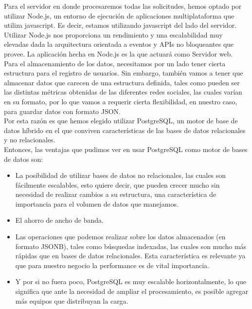 \documentclass[oneside]{book}
\begin{document}
	
Para el servidor en donde procesaremos todas las solicitudes, hemos optado por utilizar Node.js, un entorno de ejecuci\'{o}n de aplicaciones multiplataforma que utiliza javascript. Es decir, estamos utilizando javascript del lado del servidor. Utilizar Node.js nos proporciona un rendimiento y una escalabilidad muy elevadas dada la arquitectura orientada a eventos y APIs no bloqueantes que provee. La aplicación hecha en Node.js es la que actuar\'{a} como Servidor web.\\

Para el almacenamiento de los datos, necesitamos por un lado tener cierta estructura para el registro de usuarios. Sin embargo, tambi\'{e}n vamos a tener que almacenar datos que carecen de una estructura definida, tales como pueden ser las distintas m\'{e}tricas obtenidas de las diferentes redes sociales, las cuales var\'{i}an en su formato, por lo que vamos a requerir cierta flexibilidad, en nuestro caso, para guardar datos con formato JSON.\\
Por esta raz\'{o}n es que hemos elegido utilizar PostgreSQL, un motor de base de datos h\'{i}brido en el que conviven caracter\'{i}sticas de las bases de datos relacionales y no relacionales.\\

Entonces, las ventajas que pudimos ver en usar PostgreSQL como motor de bases de datos son:

\begin{itemize}

\item La posibilidad de utilizar bases de datos no relacionales, las cuales son f\'{a}cilmente escalables, esto quiere decir, que pueden crecer mucho sin necesidad de realizar cambios a su estructura, una caracter\'{i}stica de importancia para el volumen de datos que manejamos. 

\item El ahorro de ancho de banda.

\item Las operaciones que podemos realizar sobre los datos almacenados (en formato JSONB), tales como b\'{u}squedas indexadas, las cuales son mucho m\'{a}s r\'{a}pidas que en bases de datos relacionales. Esta caracter\'{i}stica es relevante ya que para nuestro negocio la performance es de vital importancia.

\item  Y por si no fuera poco, PostgreSQL es muy escalable horizontalmente, lo que significa que ante la necesidad de ampliar el procesamiento, es posible agregar m\'{a}s equipos que distribuyan la carga.

\end{itemize}
\end{document}
